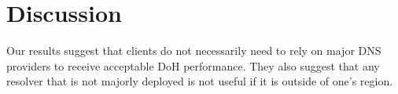 \section{Discussion}\label{sec:discussion}
Our results suggest that clients do not necessarily need to rely on major DNS providers to receive acceptable DoH performance.
They also suggest that any resolver that is not majorly deployed is not useful if it is outside of one's region.
